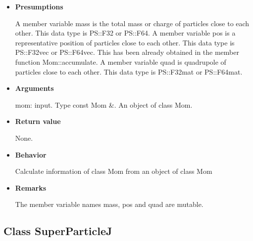 \begin{itemize}

\item {\bf Presumptions}

  A member variable mass is the total mass or charge of particles
  close to each other. This data type is PS::F32 or PS::F64. A member
  variable pos is a representative position of particles close to each
  other. This data type is PS::F32vec or PS::F64vec. This has been
  already obtained in the member function Mom::accumulate. A member
  variable quad is quadrupole of particles close to each other. This
  data type is PS::F32mat or PS::F64mat.

\item {\bf Arguments}

  mom: input. Type const Mom \&. An object of class Mom.
  
\item {\bf Return value}

  None.

\item {\bf Behavior}

  Calculate information of class Mom from an object of class Mom
  
\item {\bf Remarks}

  The member variable names mass, pos and quad are mutable.

\end{itemize}

\subsection{Class SuperParticleJ}
\label{sec:example_superparticlej}

